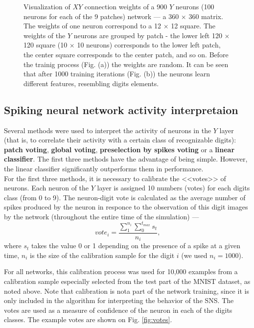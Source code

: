 \documentclass[a4paper,10pt]{article}
\begin{document}
\begin{figure}
\begin{subfigure}{0.45\textwidth}
    \caption{} 
\end{subfigure}
\caption{Visualization of $XY$ connection weights of a 900 $Y$ neurons (100 neurons for each of the 9 patches) network --- a 360 $ \times $ 360 matrix. The weights of one neuron correspond to a 12 $\times$ 12 square. The weights of the $Y$ neurons are grouped by patch - the lower left 120 $  \times $ 120 square  (10 $ \times $ 10 neurons) corresponds to the lower left patch, the center square corresponds to the center patch, and so on. Before the trainig process (Fig. (a)) the weights are random. It can be seen that after 1000 training iterations (Fig. (b)) the neurons learn different features, resembling digits elements.}
\label{fig:training}
\end{figure}

\subsection{Spiking neural network activity interpretaion}

Several methods were used to interpret the activity of neurons in the $Y$ layer (that is, to correlate their activity with a certain class of recognizable digits): \textbf{patch voting}, \textbf{global voting}, \textbf{preselection by spikes voting} or a \textbf{linear classifier}. The first three methods have the advantage of being simple. However, the linear classifier significantly outperforms them in performance. \\

For the first three methods, it is necessary to calibrate the <<votes>> of neurons. Each neuron of the $Y$ layer is assigned 10 numbers (votes) for each digits class (from 0 to 9). The neuron-digit vote is calculated as the average number of spikes produced by the neuron in responce to the observation of this digit images by the network (throughout the entire time of the simulation) ---
$$ vote_i = \frac{\sum_ {1}^{n_{i}}{\sum_{0}^{t_{max}} s_t}} {n_{i}} \text {,} $$
where $ s_t $ takes the value 0 or 1 depending on the presence of a spike at a given time, $ n_i $ is the size of the calibration sample for the digit $ i $ (we used $ n_i = 1000 $).

For all networks, this calibration process was used for 10,000 examples from a calibration sample especially selected from the test part of the MNIST dataset, as noted above. Note that calibration is nota  part of the network training, since it is only included in the algorithm for interpreting the behavior of the SNS. The votes are used as a measure of confidence of the neuron in each of the digits classes. The example votes are shown on Fig. \ref{fig:votes}.
\end{document}
